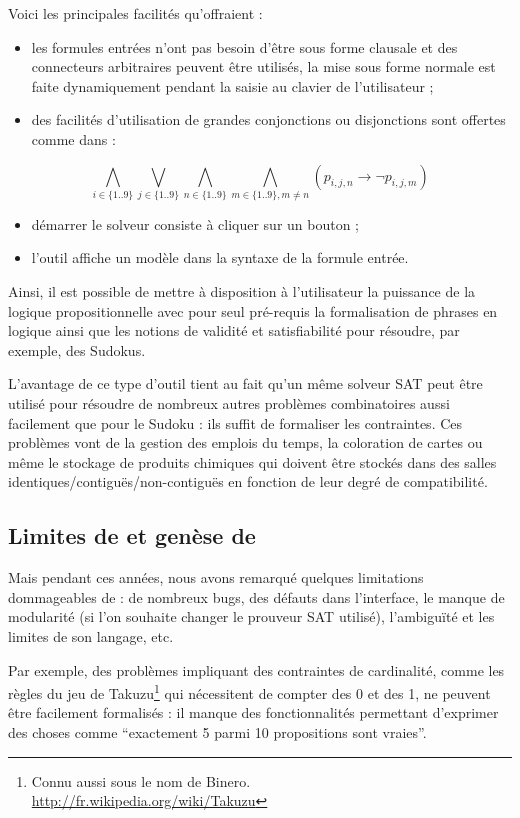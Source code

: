 Voici les principales facilités qu'offraient \satoulouse :
\begin{itemize}
\item les formules entrées n'ont pas besoin d'être sous forme clausale et des connecteurs arbitraires peuvent être utilisés, la mise sous forme normale est faite dynamiquement pendant la saisie au clavier de l'utilisateur ;
\item des facilités d'utilisation de grandes conjonctions ou disjonctions sont offertes comme dans :
\end{itemize}
  \[\bigwedge_{i\in\{1..9\}}
  \bigvee_{j\in\{1..9\}}\bigwedge_{n\in\{1..9\}}\bigwedge_{m\in\{1..9\},m\neq
    n}(p_{i,j,n}\rightarrow \lnot p_{i,j,m})\]
\begin{itemize}
\item démarrer le solveur consiste à cliquer sur un bouton ;
\item l'outil affiche un modèle dans la syntaxe de la formule entrée.
\end{itemize}
Ainsi, il est possible de mettre à disposition à l'utilisateur la puissance de la logique propositionnelle avec pour seul pré-requis la formalisation de phrases en logique ainsi que les notions de validité et satisfiabilité pour résoudre, par exemple, des Sudokus.\

L'avantage de ce type d'outil tient au fait qu'un même solveur SAT peut être utilisé pour résoudre de nombreux autres problèmes combinatoires aussi facilement que pour le Sudoku : ils suffit de formaliser les contraintes. Ces problèmes vont de la gestion des emplois du temps, la coloration de cartes ou même le stockage de produits chimiques qui doivent être stockés dans des salles identiques/contiguës/non-contiguës en fonction de leur degré de compatibilité.

\subsection{Limites de \satoulouse et genèse de \touist}
Mais pendant ces années, nous avons remarqué quelques limitations dommageables de \satoulouse : de nombreux bugs, des défauts dans l'interface, le manque de modularité (si l'on souhaite changer le prouveur SAT utilisé), l'ambiguïté et les limites de son langage, etc.

Par exemple, des problèmes impliquant des contraintes de cardinalité, comme les règles du jeu de Takuzu\footnote{Connu aussi sous le nom de Binero.\\ \url{http://fr.wikipedia.org/wiki/Takuzu}} qui nécessitent de compter des 0 et des 1, ne peuvent être facilement formalisés : il manque des fonctionnalités permettant d'exprimer des choses comme \enquote{exactement 5 parmi 10 propositions sont vraies}. 

